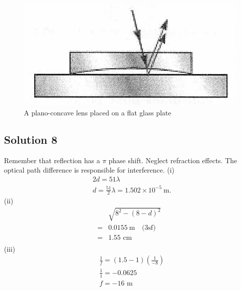 \documentclass{article}
\begin{document}
\begin{figure}
	\centering
	\includegraphics[width=0.5\linewidth]{spho_book_TYS_images/2010q8.png}
	\caption{A plano-concave lens placed on a flat glass plate} \label{2010q8}
\end{figure}
\subsection{Solution 8}
Remember that reflection has a $\pi$ phase shift. Neglect refraction effects. The optical path difference is responsible for interference.
(i) 
$$\begin{aligned}
	&2 d=51 \lambda \\
	&d=\frac{51}{2} \lambda=1.502 \times 10^{-5} \mathrm{~m} .
\end{aligned}$$
(ii) 
$$
\begin{aligned}
	& \sqrt{8^{2}-(8-d)^{2}} \\
	=& 0.0155 \mathrm{~m}\quad \text{(3sf)} \\
	=& 1.55 \text{ cm} \\
\end{aligned}
$$
(iii)
$$\begin{aligned}
	&\frac{1}{f}=(1.5-1)\left(\frac{1}{-8}\right) \\
	&\frac{1}{1}=-0.0625 \\
	&f=-16 \text{ m}
\end{aligned}$$
\end{document}
